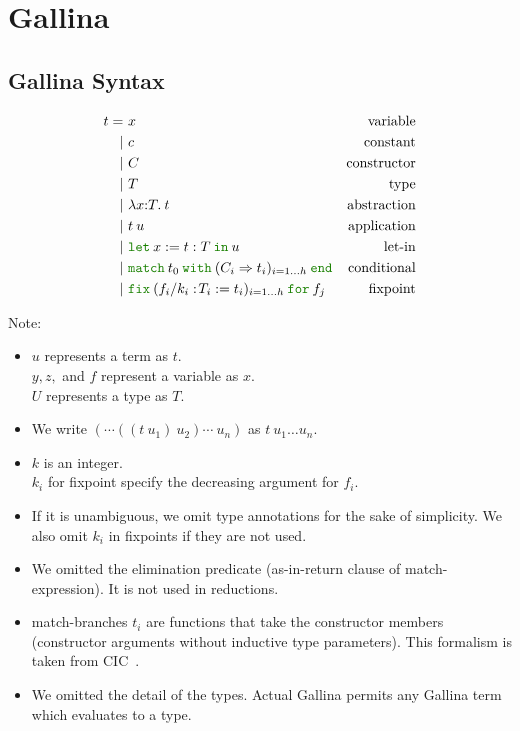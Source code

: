 \documentclass[a4paper,fleqn]{article}
\def\gallina{\textrm{Gallina}}
\newcommand{\kwlet}{\mbox{\color{mygreen}\ttfamily let}}
\newcommand{\kwin}{\mbox{\color{mygreen}\ttfamily in}}
\newcommand{\kwmatch}{\mbox{\color{mygreen}\ttfamily match}}
\newcommand{\kwas}{\mbox{\color{mygreen}\ttfamily as}}
\newcommand{\kwreturn}{\mbox{\color{mygreen}\ttfamily return}}
\newcommand{\kwwith}{\mbox{\color{mygreen}\ttfamily with}}
\newcommand{\kwend}{\mbox{\color{mygreen}\ttfamily end}}
\newcommand{\kwfix}{\mbox{\color{mygreen}\ttfamily fix}}
\newcommand{\kwfor}{\mbox{\color{mygreen}\ttfamily for}}
\newcommand{\lamT}[3]{\lambda #1\mathord{:}#2.\:#3}
\newcommand{\letin}[3]{\kwlet\:#1:=#2\:\kwin\:#3}
\newcommand{\match}[4]{\kwmatch\:#1\:\kwwith\:(#2 \Rightarrow #3)_{#4}\:\kwend}
\newcommand{\fixT}[5]{\kwfix\:(#1:\!#2 := #3)_{#4}\:\kwfor\:#5}
\begin{document}
\section{\gallina{}}\label{sec:gallina}
\subsection{\gallina{} Syntax}\label{sec:gallina-syntax}

\begin{align*}
  t =&\ x & \text{variable} \\
    |&\ c & \text{constant} \\
    |&\ C & \text{constructor} \\
    |&\ T & \text{type} \\
    |&\ \lamT{x}{T}{t}        & \text{abstraction} \\
    |&\ t\:u                  & \text{application} \\
    |&\ \letin{x}{t:T}{u}     & \text{let-in} \\
    |&\ \match{t_0}{C_i}{t_i}{i=1\ldots h} & \text{conditional} \\
    |&\ \fixT{f_i/k_i}{T_i}{t_i}{i=1\ldots h}{f_j} & \text{fixpoint}
\end{align*}
\raggedright
{\small Note:
\begin{itemize}
  \item $u$ represents a term as $t$. \\ $y, z,$ and $f$ represent a variable as $x$. \\ $U$ represents a type as $T$.
  \item We write $(\cdots((t\:u_1)\:u_2)\cdots\:u_n)$ as $t\:u_1\ldots u_n$.
  \item $k$ is an integer. \\ $k_i$ for fixpoint specify the decreasing argument for $f_i$.
  \item If it is unambiguous, we omit type annotations for the sake of simplicity.  We also omit $k_i$ in fixpoints if they are not used.
  \item We omitted the elimination predicate (\kwas-\kwin-\kwreturn{} clause of \kwmatch-expression).  It is not used in reductions.
  \item \kwmatch-branches $t_i$ are functions that take the constructor members (constructor arguments without inductive type parameters).
    This formalism is taken from CIC~\cite{coqrefman8.12.0}.
  \item We omitted the detail of the types.  Actual \gallina{} permits any \gallina{} term which evaluates to a type.
\end{itemize}}
\end{document}
